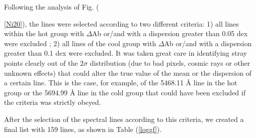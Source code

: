 \documentclass[dvips,12pt,a4paper]{report}
\begin{document}
{Following the analysis of Fig. ({\ref{Ni20}), the lines were selected according to two different criteria: 1) all lines within the hot group with $\Delta$Ab or/and with a dispersion greater than 0.05 dex were excluded ; 2) all lines of the cool group with $\Delta$Ab or/and  with a dispersion greater than 0.1 dex were excluded. It was taken great care in identifying stray points clearly out of the $2\sigma$ distribution (due to bad pixels, cosmic rays or other unknown effects) that could alter the true value of the mean or the dispersion of a certain line. This is the case, for example, of the 5468.11 \AA{} line in the hot group or the 5694.99 \AA{} line in the cold group that could have been excluded if the criteria was strictly obeyed. 

After the selection of the spectral lines according to this criteria, we created a final list with 159 lines, as shown in Table (\ref{loggf}). 

}}
\end{document}

